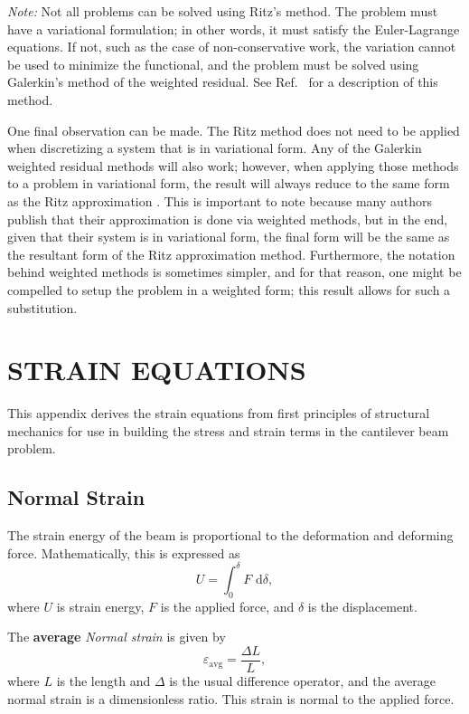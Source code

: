 \emph{Note:} Not all problems can be solved using Ritz's method. The problem must have a variational formulation; in other words, it must satisfy the Euler-Lagrange equations. If not, such as the case of non-conservative work, the variation cannot be used to minimize the functional, and the problem must be solved using Galerkin's method of the weighted residual. See Ref.~\cite{duchateau1992advanced} for a description of this method.

One final observation can be made. The Ritz method does not need to be applied when discretizing a system that is in variational form. Any of the Galerkin weighted residual methods will also work; however, when applying those methods to a problem in variational form, the result will always reduce to the same form as the Ritz approximation \cite{reddy1984energy}. This is important to note because many authors publish that their approximation is done via weighted methods, but in the end, given that their system is in variational form, the final form will be the same as the resultant form of the Ritz approximation method. Furthermore, the notation behind weighted methods is sometimes simpler, and for that reason, one might be compelled to setup the problem in a weighted form; this result allows for such a substitution.

\chapter{STRAIN EQUATIONS}
\label{app:strain}
This appendix derives the strain equations from first principles of structural mechanics for use in building the stress and strain terms in the cantilever beam problem.

\section{Normal Strain}
The strain energy of the beam is proportional to the deformation and deforming force. Mathematically, this is expressed as
\begin{equation}
U = \int_0^\delta F\text{ d}\delta,
\label{eq:strain.base}
\end{equation}
where $U$ is strain energy, $F$ is the applied force, and $\delta$ is the displacement.

The \textbf{average} \emph{Normal strain} is given by 
\begin{equation}
\varepsilon_{\text{avg}} = \frac{\Delta L}{L},
\label{eq:avg.normal.strain}
\end{equation}
where $L$ is the length and $\Delta$ is the usual difference operator, and the average normal strain is a dimensionless ratio. This strain is normal to the applied force.

